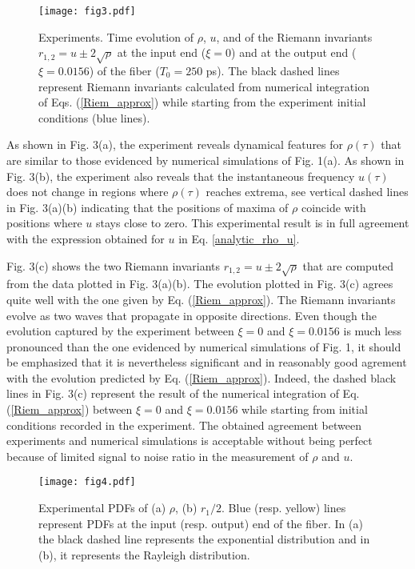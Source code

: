 \documentclass[twocolumn,preprintnumbers,amsmath,amssymb,superscriptaddress]{revtex4}
\begin{document}
\begin{figure}[h]
\texttt{[image: fig3.pdf]}
\caption{Experiments. Time evolution of $\rho$, $u$, and of 
  the Riemann invariants $r_{1,2}=u \pm 2 \sqrt{\rho}$ at the input end ($\xi=0$)
  and at the output end ($\xi=0.0156$) of the fiber
  ($T_0=250$ ps). The black dashed lines represent Riemann invariants
  calculated from numerical integration of Eqs. (\ref{Riem_approx})
  while starting from the experiment initial conditions
 (blue lines).}
\end{figure}


As shown in Fig. 3(a), the experiment reveals dynamical features 
for $\rho(\tau)$ that are similar to 
those evidenced by numerical simulations of Fig. 1(a). 
As shown in Fig. 3(b), the experiment also reveals that the instantaneous 
frequency  $u(\tau)$ does not change
in regions where $\rho(\tau)$ reaches extrema, see vertical dashed
lines in Fig. 3(a)(b) indicating that the positions of maxima of $\rho$
coincide with positions where $u$ stays close to zero. This experimental 
result is in full agreement with the expression obtained for $u$
in Eq. \ref{analytic_rho_u}. 

Fig. 3(c) shows the two Riemann invariants $r_{1,2}=u \pm 2 \sqrt{\rho}$
that are computed from  the data plotted in Fig. 3(a)(b). The
evolution plotted in Fig. 3(c) agrees quite  well with the one
given by Eq. (\ref{Riem_approx}). The Riemann invariants evolve 
as two waves that propagate in opposite directions. Even though 
the evolution captured by the experiment between $\xi=0$ and
$\xi=0.0156$ is much less pronounced than the one evidenced 
by numerical simulations of Fig. 1, it should be emphasized that 
it is nevertheless significant and in reasonably good agrement 
with the evolution predicted by Eq. (\ref{Riem_approx}).
Indeed, the dashed black
lines in Fig. 3(c) represent the result of the numerical
integration  of Eq. (\ref{Riem_approx}) between $\xi=0$ and
$\xi=0.0156$ while starting from  initial conditions recorded in the
experiment. The  obtained
agreement between experiments and numerical simulations is acceptable
without being perfect because of limited signal to noise ratio in the
measurement  of $\rho$ and $u$. 


\begin{figure}[h]
\texttt{[image: fig4.pdf]}
\caption{Experimental PDFs of (a) $\rho$, 
  (b) $r_1/2$. Blue (resp. yellow)
  lines represent PDFs at the input (resp. output) end of the
  fiber. In (a) the black dashed line represents the exponential
  distribution and in (b), it represents
  the Rayleigh distribution.}
\end{figure}
\end{document}
